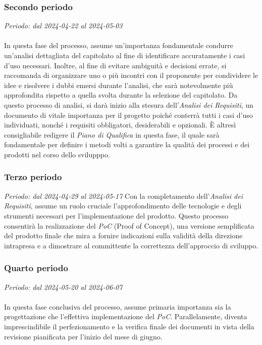 \subsubsection{Secondo periodo}
\textit{Periodo: dal 2024-04-22 al 2024-05-03}
\\\\
In questa fase del processo, assume un'importanza fondamentale condurre un'analisi dettagliata del capitolato al fine di identificare accuratamente i casi d'uso necessari. Inoltre, al fine di evitare ambiguità e decisioni errate, si raccomanda di organizzare uno o più incontri con il proponente per condividere le idee e risolvere i dubbi emersi durante l'analisi, che sarà notevolmente più approfondita rispetto a quella svolta durante la selezione del capitolato.
Da questo processo di analisi, si darà inizio alla stesura dell'\textit{Analisi dei Requisiti}, un documento di vitale importanza per il progetto poiché conterrà tutti i casi d'uso individuati, nonché i requisiti obbligatori, desiderabili e opzionali.
È altresì consigliabile redigere il \textit{Piano di Qualifica} in questa fase, il quale sarà fondamentale per definire i metodi volti a garantire la qualità dei processi e dei prodotti nel corso dello svilupppo.

\subsubsection{Terzo periodo}
\textit{Periodo: dal 2024-04-29 al 2024-05-17}
Con la completamento dell'\textit{Analisi dei Requisiti}, assume un ruolo cruciale l'approfondimento delle tecnologie e degli strumenti necessari per l'implementazione del prodotto. Questo processo consentirà la realizzazione del \textit{PoC} (Proof of Concept), una versione semplificata del prodotto finale che mira a fornire indicazioni sulla validità della direzione intrapresa e a dimostrare al committente la correttezza dell'approccio di sviluppo.

\subsubsection{Quarto periodo}
\textit{Periodo: dal 2024-05-20 al 2024-06-07}
\\\\
In questa fase conclusiva del processo, assume primaria importanza sia la progettazione che l'effettiva implementazione del \textit{PoC}. Parallelamente, diventa imprescindibile il perfezionamento e la verifica finale dei documenti in vista della revisione pianificata per l'inizio del mese di giugno.

